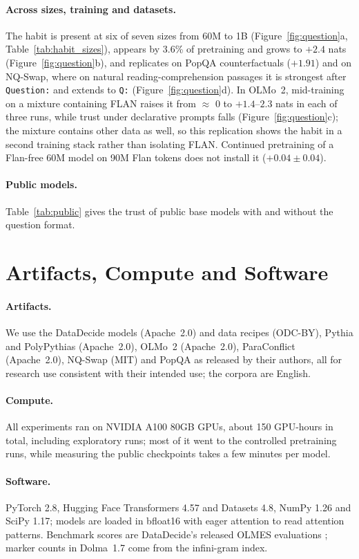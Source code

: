 \documentclass[11pt]{article}
\newcommand{\tmpl}[1]{\texttt{#1}}
\begin{document}
\paragraph{Across sizes, training and datasets.} The habit is present at six of seven sizes from 60M to 1B (Figure~\ref{fig:question}a, Table~\ref{tab:habit_sizes}), appears by 3.6\% of pretraining and grows to $+2.4$ nats (Figure~\ref{fig:question}b), and replicates on PopQA counterfactuals ($+1.91$) and on NQ-Swap, where on natural reading-comprehension passages it is strongest after \tmpl{Question:} and extends to \tmpl{Q:} (Figure~\ref{fig:question}d).
In OLMo~2, mid-training on a mixture containing FLAN raises it from $\approx$ 0 to $+1.4$--$2.3$ nats in each of three runs, while trust under declarative prompts falls (Figure~\ref{fig:question}c); the mixture contains other data as well, so this replication shows the habit in a second training stack rather than isolating FLAN.
Continued pretraining of a Flan-free 60M model on 90M Flan tokens does not install it ($+0.04 \pm 0.04$).
\paragraph{Public models.} Table~\ref{tab:public} gives the trust of public base models with and without the question format.

\section{Artifacts, Compute and Software}
\label{app:artifacts}
\paragraph{Artifacts.} We use the DataDecide models (Apache~2.0) and data recipes (ODC-BY), Pythia and PolyPythias (Apache~2.0), OLMo~2 (Apache~2.0), ParaConflict (Apache~2.0), NQ-Swap (MIT) and PopQA as released by their authors, all for research use consistent with their intended use; the corpora are English.
\paragraph{Compute.} All experiments ran on NVIDIA A100 80GB GPUs, about 150 GPU-hours in total, including exploratory runs; most of it went to the controlled pretraining runs, while measuring the public checkpoints takes a few minutes per model.
\paragraph{Software.} PyTorch 2.8, Hugging Face Transformers 4.57 and Datasets 4.8, NumPy 1.26 and SciPy 1.17; models are loaded in bfloat16 with eager attention to read attention patterns. Benchmark scores are DataDecide's released OLMES evaluations \citep{magnusson2025datadecide}; marker counts in Dolma~1.7 come from the infini-gram index.
\end{document}
